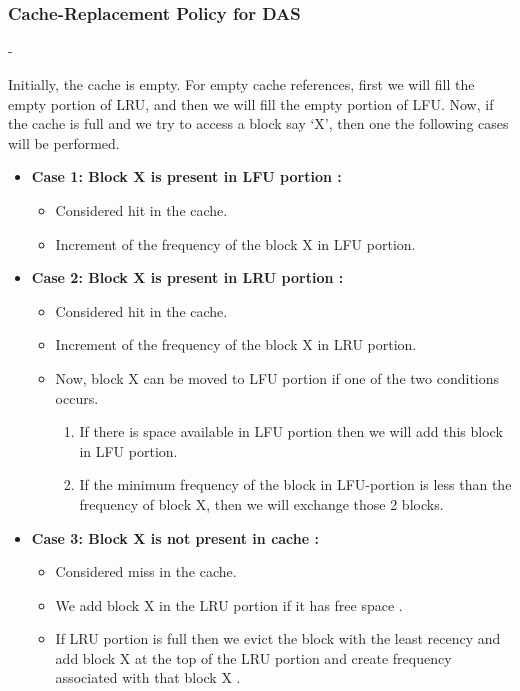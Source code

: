 \documentclass[conference]{IEEEtran}
\begin{document}
\\
\\

\subsubsection*{\textbf{Cache-Replacement Policy for DAS}}-

Initially, the cache is empty. For empty cache references, first we will fill the empty portion of LRU, and then we will fill the empty portion of LFU. Now, if the cache is full and we try to access a block say ‘X’, then one the following cases will be performed.\\

\begin{itemize}
    \item \textbf{ Case 1: Block X is present in LFU portion :}
    \begin{itemize}
        \item Considered hit in the cache.
        \item Increment of the frequency of the block X in LFU portion.
    \end{itemize}
    
    \item \textbf{ Case 2: Block X is present in LRU portion :}
    \begin{itemize}
        \item Considered hit in the cache.
        \item Increment of the frequency of the block X in LRU portion.
        \item Now, block X can be moved to LFU portion if one of the two conditions occurs.
        \begin{enumerate}
        
            \item If there is space available in LFU portion then we will add this block in LFU portion.
            \item If the minimum frequency of the block in LFU-portion is less than the frequency of block X, then we will exchange those 2 blocks.

        \end{enumerate}
    \end{itemize}
    
    \item \textbf{ Case 3: Block X is not present in cache :}
    \begin{itemize}
        \item Considered miss in the cache.
        \item We add block X in the LRU portion if it has free space .
        \item If LRU portion is full then we evict the block with the least recency and add block X at the top of the LRU portion and create frequency associated with that block X .

    \end{itemize}
    
\end{itemize}\\
\end{document}
